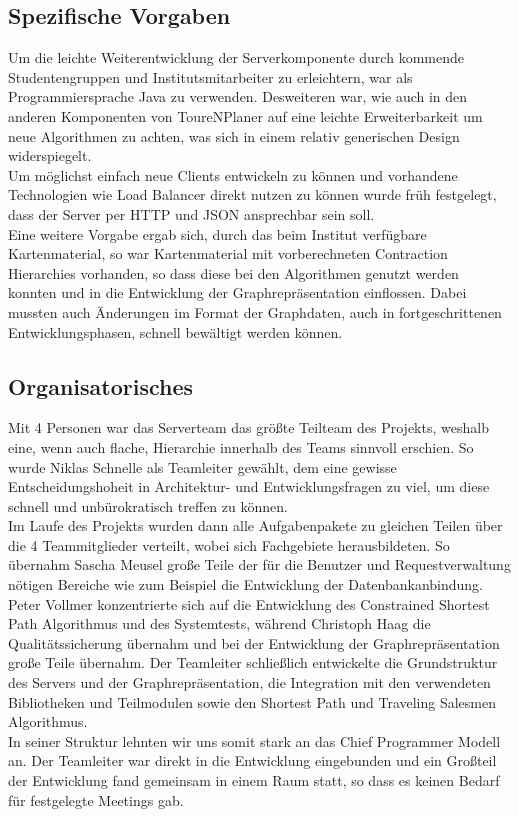 \subsection*{Spezifische Vorgaben}
Um die leichte Weiterentwicklung der Serverkomponente durch kommende Studentengruppen und Institutsmitarbeiter zu erleichtern, war als Programmiersprache Java zu verwenden. Desweiteren war, wie auch in den anderen Komponenten von ToureNPlaner auf eine leichte Erweiterbarkeit um neue Algorithmen zu achten, was sich in einem relativ generischen Design widerspiegelt.\\
Um möglichst einfach neue Clients entwickeln zu können und vorhandene Technologien wie Load Balancer direkt nutzen zu können wurde früh festgelegt, dass der Server per HTTP und JSON ansprechbar sein soll.\\
Eine weitere Vorgabe ergab sich, durch das beim Institut verfügbare Kartenmaterial, so war Kartenmaterial mit vorberechneten Contraction Hierarchies vorhanden, so dass diese bei den Algorithmen genutzt werden konnten und in die Entwicklung der Graphrepräsentation einflossen. Dabei mussten auch Änderungen im Format der Graphdaten, auch in fortgeschrittenen Entwicklungsphasen, schnell bewältigt werden können.
\subsection*{Organisatorisches}
Mit 4 Personen war das Serverteam das größte Teilteam des Projekts, weshalb eine, wenn auch flache, Hierarchie innerhalb des Teams sinnvoll erschien. So wurde Niklas Schnelle als Teamleiter gewählt, dem eine gewisse Entscheidungshoheit in Architektur- und Entwicklungsfragen zu viel, um diese schnell und unbürokratisch treffen zu können.\\
Im Laufe des Projekts wurden dann alle Aufgabenpakete zu gleichen Teilen über die 4 Teammitglieder verteilt, wobei sich Fachgebiete herausbildeten.
So übernahm Sascha Meusel große Teile der für die Benutzer und Requestverwaltung nötigen Bereiche wie zum Beispiel die Entwicklung der Datenbankanbindung.
Peter Vollmer konzentrierte sich auf die Entwicklung des Constrained Shortest Path Algorithmus und des Systemtests, während Christoph Haag die Qualitätssicherung übernahm und bei der Entwicklung der Graphrepräsentation große Teile übernahm. Der Teamleiter schließlich entwickelte die Grundstruktur des Servers und der Graphrepräsentation, die Integration mit den verwendeten Bibliotheken und Teilmodulen sowie den Shortest Path und Traveling Salesmen Algorithmus.\\
In seiner Struktur lehnten wir uns somit stark an das Chief Programmer Modell an. Der Teamleiter war direkt in die Entwicklung eingebunden und ein Großteil der Entwicklung fand gemeinsam in einem Raum statt, so dass es keinen Bedarf für festgelegte Meetings gab.
